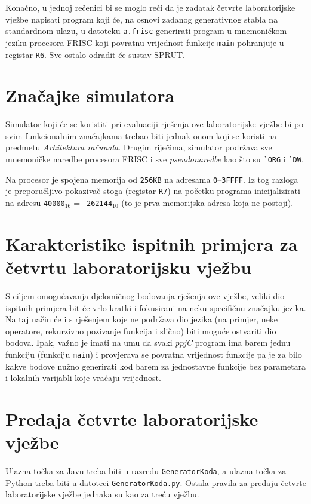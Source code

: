 \documentclass[times, 12pt, utf8]{book}
\begin{document}
Konačno, u jednoj rečenici bi se moglo reći da je zadatak četvrte laboratorijske vježbe napisati program koji će, na osnovi zadanog generativnog stabla na standardnom ulazu, u datoteku \verb|a.frisc| generirati program u mnemoničkom jeziku procesora FRISC koji povratnu vrijednost funkcije \verb|main| pohranjuje u registar \verb|R6|.
Sve ostalo odradit će sustav SPRUT.

\section{Značajke simulatora}\label{sec:znacajke_simulatora}
Simulator koji će se koristiti pri evaluaciji rješenja ove laboratorijske vježbe bi po svim funkcionalnim značajkama trebao biti jednak onom koji se koristi na predmetu \emph{Arhitektura računala}.
Drugim riječima, simulator podržava sve mnemoničke naredbe procesora FRISC i sve \emph{pseudonaredbe} kao što su \texttt{\`{}ORG} i \texttt{\`{}DW}.

Na procesor je spojena memorija od \verb|256KB| na adresama \verb|0|--\verb|3FFFF|.
Iz tog razloga je preporučljivo pokazivač stoga (registar \verb|R7|) na početku programa inicijalizirati na adresu \verb|40000|\(_{16} =\)\verb| 262144|\(_{10}\) (to je prva memorijska adresa koja ne postoji).

\section{Karakteristike ispitnih primjera za četvrtu laboratorijsku vježbu}
S ciljem omogućavanja djelomičnog bodovanja rješenja ove vježbe, veliki dio ispitnih primjera bit će vrlo kratki i fokusirani na neku specifičnu značajku jezika.
Na taj način će i s rješenjem koje ne podržava dio jezika (na primjer, neke operatore, rekurzivno pozivanje funkcija i slično) biti moguće ostvariti dio bodova.
Ipak, važno je imati na umu da svaki \emph{ppjC} program ima barem jednu funkciju (funkciju \verb|main|) i provjerava se povratna vrijednost funkcije pa je za bilo kakve bodove nužno generirati kod barem za jednostavne funkcije bez parametara i lokalnih varijabli koje vraćaju vrijednost.

\section{Predaja četvrte laboratorijske vježbe}
Ulazna točka za Javu treba biti u razredu \verb|GeneratorKoda|, a ulazna točka za Python treba biti u datoteci \verb|GeneratorKoda.py|.
Ostala pravila za predaju četvrte laboratorijske vježbe jednaka su kao za treću vježbu.
\end{document}
